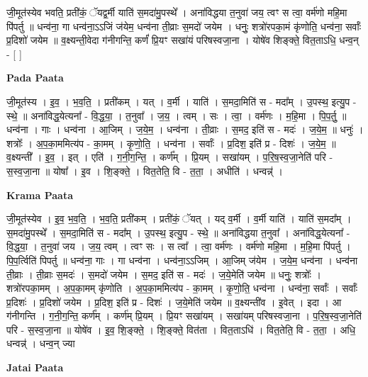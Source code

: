 \documentclass[17pt]{extarticle}
\begin{document}
जी॒मूत॑स्येव भवति॒ प्रती॑कं॒ ॅयद्व॒र्मी याति॑ स॒मदा॑मु॒पस्थे᳚ । अना॑विद्धया त॒नुवा॑ जय॒ त्वꣳ स त्वा॒ वर्म॑णो महि॒मा पि॑पर्तु ॥ धन्व॑ना॒ गा धन्व॑ना॒ऽऽजिं ज॑येम॒ धन्व॑ना ती॒व्राः स॒मदो॑ जयेम । धनुः॒ शत्रो॑रपका॒मं कृ॑णोति॒ धन्व॑ना॒ सर्वाः᳚ प्र॒दिशो॑ जयेम ॥ व॒क्ष्यन्ती॒वेदा ग॑नीगन्ति॒ कर्णं॑ प्रि॒यꣳ सखा॑यं परिषस्वजा॒ना । योषे॑व शिङ्क्ते॒ वित॒ताऽधि॒ धन्व॒न् - [  ] \newline

\textbf{Pada Paata} \newline

जी॒मूत॑स्य । इ॒व॒ । भ॒व॒ति॒ । प्रती॑कम् । यत् । व॒र्मी । याति॑ । स॒मदा॒मिति॑ स - मदा᳚म् । उ॒पस्थ॒ इत्यु॒प - स्थे॒ ॥ अना॑विद्ध॒येत्यना᳚ - वि॒द्ध॒या॒ । त॒नुवा᳚ । ज॒य॒ । त्वम् । सः । त्वा॒ । वर्म॑णः । म॒हि॒मा । पि॒प॒र्तु॒ ॥ धन्व॑ना । गाः । धन्व॑ना । आ॒जिम् । ज॒ये॒म॒ । धन्व॑ना । ती॒व्राः । स॒मद॒ इति॑ स - मदः॑ । ज॒ये॒म॒ ॥ धनुः॑ । शत्रोः᳚ । अ॒प॒का॒ममित्य॑प - का॒मम् । कृ॒णो॒ति॒ । धन्व॑ना । सर्वाः᳚ । प्र॒दिश॒ इति॑ प्र - दिशः॑ । ज॒ये॒म॒ ॥ व॒क्ष्यन्ती᳚ । इ॒व॒ । इत् । एति॑ । ग॒नी॒ग॒न्ति॒ । कर्ण᳚म् । प्रि॒यम् । सखा॑यम् । प॒रि॒ष॒स्व॒जा॒नेति॑ परि - स॒स्व॒जा॒ना ॥ योषा᳚ । इ॒व । शि॒ङ्क्ते॒ । वित॒तेति॒ वि - त॒ता॒ । अधीति॑ । धन्वन्न्॑ ।  \newline


\textbf{Krama Paata} \newline

जी॒मूत॑स्येव । इ॒व॒ भ॒व॒ति॒ । भ॒व॒ति॒ प्रती॑कम् । प्रती॑कं॒ ॅयत् । यद् व॒र्मी । व॒र्मी याति॑ । याति॑ स॒मदा᳚म् । स॒मदा॑मु॒पस्थे᳚ । स॒मदा॒मिति॑ स - मदा᳚म् । उ॒पस्थ॒ इत्यु॒प - स्थे॒ ॥ अना॑विद्धया त॒नुवा᳚ । अना॑विद्ध॒येत्यना᳚ - वि॒द्ध॒या॒ । त॒नुवा॑ जय । ज॒य॒ त्वम् । त्वꣳ सः । स त्वा᳚ । त्वा॒ वर्म॑णः । वर्म॑णो महि॒मा । म॒हि॒मा पि॑पर्तु । पि॒प॒र्त्विति॑ पिपर्तु ॥ धन्व॑ना॒ गाः । गा धन्व॑ना । धन्व॑ना॒ऽऽजिम् । आ॒जिम् ज॑येम । ज॒ये॒म॒ धन्व॑ना । धन्व॑ना ती॒व्राः । ती॒व्राः स॒मदः॑ । स॒मदो॑ जयेम । स॒मद॒ इति॑ स - मदः॑ । ज॒ये॒मेति॑ जयेम ॥ धनुः॒ शत्रोः᳚ । शत्रो॑रपका॒मम् । अ॒प॒का॒मम् कृ॑णोति । अ॒प॒का॒ममित्य॑प - का॒मम् । कृ॒णो॒ति॒ धन्व॑ना । धन्व॑ना॒ सर्वाः᳚ । सर्वाः᳚ प्र॒दिशः॑ । प्र॒दिशो॑ जयेम । प्र॒दिश॒ इति॑ प्र - दिशः॑ । ज॒ये॒मेति॑ जयेम ॥ व॒क्ष्यन्ती॑व । इ॒वेत् । इदा । आ ग॑नीगन्ति । ग॒नी॒ग॒न्ति॒ कर्ण᳚म् । कर्ण॑म् प्रि॒यम् । प्रि॒यꣳ सखा॑यम् । सखा॑यम् परिषस्वजा॒ना । प॒रि॒ष॒स्व॒जा॒नेति॑ परि - स॒स्व॒जा॒ना ॥ योषे॑व । इ॒व॒ शि॒ङ्क्ते॒ । शि॒ङ्क्ते॒ वित॑ता । वित॒ताऽधि॑ । वित॒तेति॒ वि - त॒ता॒ । अधि॒ धन्वन्न्॑ । धन्व॒न् ज्या \newline

\textbf{Jatai Paata} \newline
\end{document}
